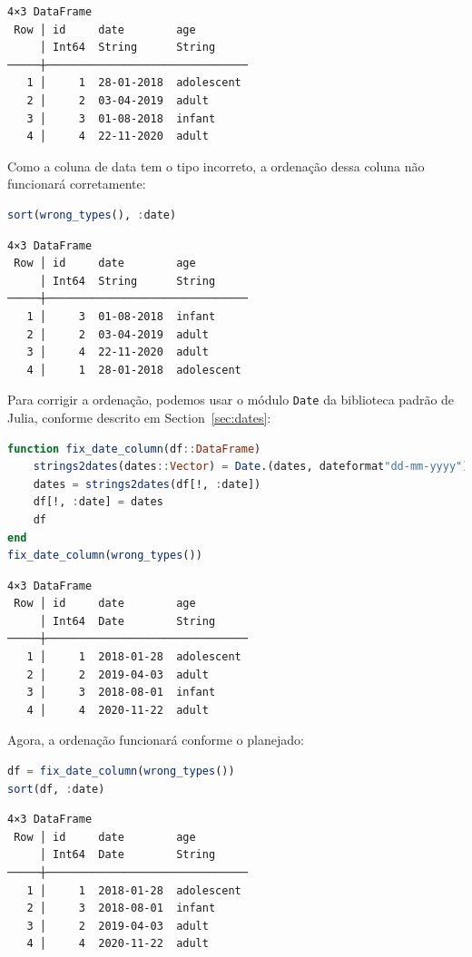 \documentclass[
  notoc %
]{tufte-book}
\newcommand{\passthrough}[1]{#1}
\begin{document}
\begin{lstlisting}[language=Output]
4×3 DataFrame
 Row │ id     date        age
     │ Int64  String      String
─────┼───────────────────────────────
   1 │     1  28-01-2018  adolescent
   2 │     2  03-04-2019  adult
   3 │     3  01-08-2018  infant
   4 │     4  22-11-2020  adult
\end{lstlisting}

Como a coluna de data tem o tipo incorreto, a ordenação dessa coluna não
funcionará corretamente:

\begin{lstlisting}[language=Julia]
sort(wrong_types(), :date)
\end{lstlisting}

\begin{lstlisting}[language=Output]
4×3 DataFrame
 Row │ id     date        age
     │ Int64  String      String
─────┼───────────────────────────────
   1 │     3  01-08-2018  infant
   2 │     2  03-04-2019  adult
   3 │     4  22-11-2020  adult
   4 │     1  28-01-2018  adolescent
\end{lstlisting}

Para corrigir a ordenação, podemos usar o módulo
\passthrough{\lstinline!Date!} da biblioteca padrão de Julia, conforme
descrito em Section~\ref{sec:dates}:

\begin{lstlisting}[language=Julia]
function fix_date_column(df::DataFrame)
    strings2dates(dates::Vector) = Date.(dates, dateformat"dd-mm-yyyy")
    dates = strings2dates(df[!, :date])
    df[!, :date] = dates
    df
end
fix_date_column(wrong_types())
\end{lstlisting}

\begin{lstlisting}[language=Output]
4×3 DataFrame
 Row │ id     date        age
     │ Int64  Date        String
─────┼───────────────────────────────
   1 │     1  2018-01-28  adolescent
   2 │     2  2019-04-03  adult
   3 │     3  2018-08-01  infant
   4 │     4  2020-11-22  adult
\end{lstlisting}

Agora, a ordenação funcionará conforme o planejado:

\begin{lstlisting}[language=Julia]
df = fix_date_column(wrong_types())
sort(df, :date)
\end{lstlisting}

\begin{lstlisting}[language=Output]
4×3 DataFrame
 Row │ id     date        age
     │ Int64  Date        String
─────┼───────────────────────────────
   1 │     1  2018-01-28  adolescent
   2 │     3  2018-08-01  infant
   3 │     2  2019-04-03  adult
   4 │     4  2020-11-22  adult
\end{lstlisting}
\end{document}
